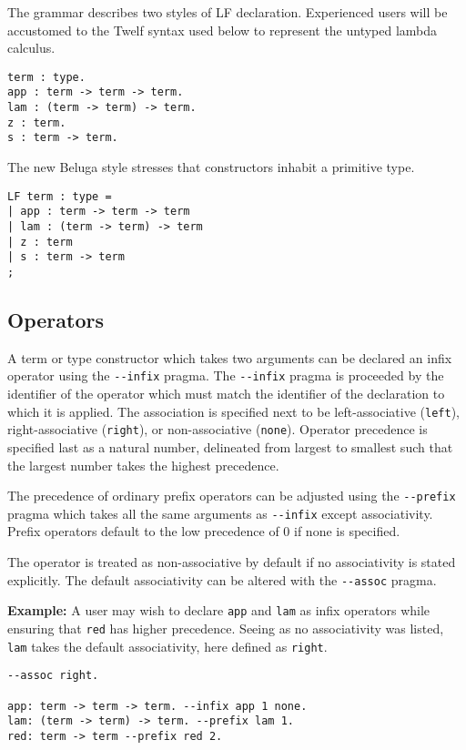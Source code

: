 \documentclass[11pt]{article}
\begin{document}
The grammar describes two styles of LF declaration.
Experienced users will be accustomed to the Twelf syntax used below to represent the untyped lambda calculus.
\begin{verbatim}
term : type.
app : term -> term -> term.
lam : (term -> term) -> term.
z : term.
s : term -> term.
\end{verbatim}

The new Beluga style stresses that constructors inhabit a primitive type.
\begin{verbatim}
LF term : type =
| app : term -> term -> term
| lam : (term -> term) -> term
| z : term
| s : term -> term
;
\end{verbatim}

\subsection{Operators}
A term or type constructor which takes two arguments can be declared an infix operator using the \verb+--infix+ pragma.
The \verb+--infix+ pragma is proceeded by the identifier of the operator which must match the identifier of the declaration to which it is applied.
The association is specified next to be left-associative (\verb+left+), right-associative (\verb+right+), or non-associative (\verb+none+).
Operator precedence is specified last as a natural number, delineated from largest to smallest such that the largest number takes the highest precedence.

The precedence of ordinary prefix operators can be adjusted using the \verb+--prefix+ pragma which takes all the same arguments as \verb+--infix+ except associativity.
Prefix operators default to the low precedence of 0 if none is specified.

The operator is treated as non-associative by default if no associativity is stated explicitly.
The default associativity can be altered with the \verb+--assoc+ pragma.

\textbf{Example:} A user may wish to declare \verb+app+ and \verb+lam+ as infix operators while ensuring that \verb+red+ has higher precedence.
Seeing as no associativity was listed, \verb+lam+ takes the default associativity, here defined as \verb+right+.
\begin{verbatim}
--assoc right.

app: term -> term -> term. --infix app 1 none.
lam: (term -> term) -> term. --prefix lam 1.
red: term -> term --prefix red 2.
\end{verbatim}
\end{document}
